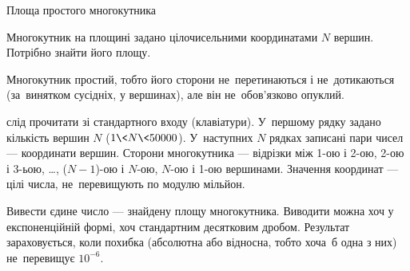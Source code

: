 ﻿\begin{problemAllDefault}{Площа простого многокутника}

Многокутник на площині задано цілочисельними координатами $N$ вершин. Потрібно знайти його площу. 

Многокутник простий, тобто його сторони не~перетинаються і не~дотикаються (за~винятком сусідніх, у вершинах), але він не~обов'язково опуклий.

\InputFile слід прочитати зі стандартного входу (клавіатури). У~першому рядку задано кількість вершин $N$ ($1\<N\<50000$). У~наступних $N$ рядках записані пари чисел --- координати вершин. Сторони многокутника --- відрізки між 1-ою і 2-ою, 2-ою і 3-ьою, \ldots, ($N-1$)-ою і $N$-ою, $N$-ою і 1-ою вершинами. Значення координат --- цілі числа, не~перевищують по модулю мільйон.

\OutputFile Вивести єдине число --- знайдену площу многокутника. Виводити можна хоч у експоненційній формі, хоч стандартним десятковим дробом. Результат зараховується, коли похибка (абсолютна або відносна, тобто хоча~б одна з них) не~перевищує $10^{-6}$.

\Example

\begin{example}
\end{example}

\end{problemAllDefault}
